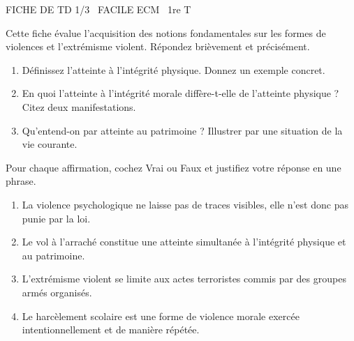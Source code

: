 \documentclass[11pt]{article}
\begin{document}
\begin{tcolorbox}[enhanced,colback=popink,colframe=popink,arc=10pt,boxrule=0pt,left=12pt,right=12pt,top=9pt,bottom=9pt]
{\color{white}\popxbold\small FICHE DE TD 1/3 \textbullet\ FACILE \hfill ECM \textbullet\ 1re T\par}
\end{tcolorbox}
\vspace{4pt}
Cette fiche évalue l'acquisition des notions fondamentales sur les formes de violences et l'extrémisme violent. Répondez brièvement et précisément.

\begin{exercice}
\begin{enumerate}
    \item Définissez l'atteinte à l'intégrité physique. Donnez un exemple concret.
    \item En quoi l'atteinte à l'intégrité morale diffère-t-elle de l'atteinte physique ? Citez deux manifestations.
    \item Qu'entend-on par atteinte au patrimoine ? Illustrer par une situation de la vie courante.
\end{enumerate}
\end{exercice}

\begin{exercice}
Pour chaque affirmation, cochez Vrai ou Faux et justifiez votre réponse en une phrase.
\begin{enumerate}
    \item La violence psychologique ne laisse pas de traces visibles, elle n'est donc pas punie par la loi.
    \item Le vol à l'arraché constitue une atteinte simultanée à l'intégrité physique et au patrimoine.
    \item L'extrémisme violent se limite aux actes terroristes commis par des groupes armés organisés.
    \item Le harcèlement scolaire est une forme de violence morale exercée intentionnellement et de manière répétée.
\end{enumerate}
\end{exercice}
\end{document}
